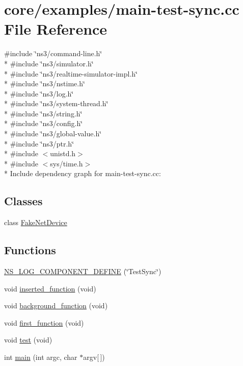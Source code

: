 \hypertarget{main-test-sync_8cc}{}\section{core/examples/main-\/test-\/sync.cc File Reference}
\label{main-test-sync_8cc}
{\ttfamily \#include \char`\"{}ns3/command-\/line.\+h\char`\"{}}\\*
{\ttfamily \#include \char`\"{}ns3/simulator.\+h\char`\"{}}\\*
{\ttfamily \#include \char`\"{}ns3/realtime-\/simulator-\/impl.\+h\char`\"{}}\\*
{\ttfamily \#include \char`\"{}ns3/nstime.\+h\char`\"{}}\\*
{\ttfamily \#include \char`\"{}ns3/log.\+h\char`\"{}}\\*
{\ttfamily \#include \char`\"{}ns3/system-\/thread.\+h\char`\"{}}\\*
{\ttfamily \#include \char`\"{}ns3/string.\+h\char`\"{}}\\*
{\ttfamily \#include \char`\"{}ns3/config.\+h\char`\"{}}\\*
{\ttfamily \#include \char`\"{}ns3/global-\/value.\+h\char`\"{}}\\*
{\ttfamily \#include \char`\"{}ns3/ptr.\+h\char`\"{}}\\*
{\ttfamily \#include $<$unistd.\+h$>$}\\*
{\ttfamily \#include $<$sys/time.\+h$>$}\\*
Include dependency graph for main-\/test-\/sync.cc\+:
\subsection*{Classes}
\begin{DoxyCompactItemize}
\item 
class \hyperlink{classFakeNetDevice}{Fake\+Net\+Device}
\end{DoxyCompactItemize}
\subsection*{Functions}
\begin{DoxyCompactItemize}
\item 
\hyperlink{main-test-sync_8cc_a3def2f3d782680e485a25432e225618c}{N\+S\+\_\+\+L\+O\+G\+\_\+\+C\+O\+M\+P\+O\+N\+E\+N\+T\+\_\+\+D\+E\+F\+I\+NE} (\char`\"{}Test\+Sync\char`\"{})
\item 
void \hyperlink{main-test-sync_8cc_a9b03c33f77fcea8b7888887fed6aa11f}{inserted\+\_\+function} (void)
\item 
void \hyperlink{main-test-sync_8cc_afeb997847681305e1f5fd01776870464}{background\+\_\+function} (void)
\item 
void \hyperlink{main-test-sync_8cc_aa009afa571d9f2b4edbeeb80fb22fca3}{first\+\_\+function} (void)
\item 
void \hyperlink{main-test-sync_8cc_a708a4c1a4d0c4acc4c447310dd4db27f}{test} (void)
\item 
int \hyperlink{main-test-sync_8cc_a0ddf1224851353fc92bfbff6f499fa97}{main} (int argc, char $\ast$argv\mbox{[}$\,$\mbox{]})
\end{DoxyCompactItemize}
